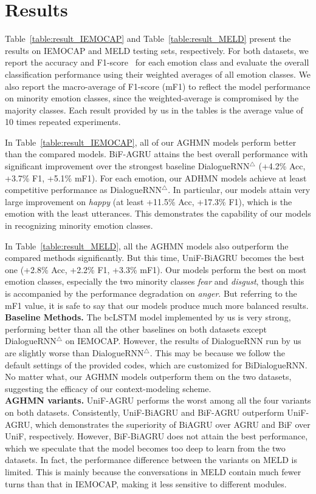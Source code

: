 \documentclass[letterpaper]{article} %
\begin{document}
\section{Results}

Table~\ref{table:result_IEMOCAP} and Table~\ref{table:result_MELD} present the results on IEMOCAP and MELD testing sets, respectively. For both datasets, we report the accuracy and F1-score~\cite{DBLP:conf/acl/TongZJM17} for each emotion class and evaluate the overall classification performance using their weighted averages of all emotion classes. We also report the macro-average of F1-score (mF1) to reflect the model performance on minority emotion classes, since the weighted-average is compromised by the majority classes. Each result provided by us in the tables is the average value of 10 times repeated experiments.

In Table~\ref{table:result_IEMOCAP}, all of our AGHMN models perform better than the compared models. BiF-AGRU attains the best overall performance with significant improvement over the strongest baseline DialogueRNN$^\triangle$ (+4.2\% Acc, +3.7\% F1, +5.1\% mF1). For each emotion, our ADHMN models achieve at least competitive performance as DialogueRNN$^\triangle$. In particular, our models attain very large improvement on \textit{happy} (at least +11.5\% Acc, +17.3\% F1), which is the emotion with the least utterances. This demonstrates the capability of our models in recognizing minority emotion classes.

In Table~\ref{table:result_MELD}, all the AGHMN models also outperform the compared methods significantly. But this time, UniF-BiAGRU becomes the best one (+2.8\% Acc, +2.2\% F1, +3.3\% mF1).
Our models perform the best on most emotion classes, especially the two minority classes \textit{fear} and \textit{disgust}, though this is accompanied by the performance degradation on \textit{anger}. But referring to the mF1 value, it is safe to say that our models produce much more balanced results. 
\\[1ex]
\noindent\textbf{Baseline Methods.}
The bcLSTM model implemented by us is very strong, performing better than all the other baselines on both datasets except DialogueRNN$^\triangle$ on IEMOCAP. However, the results of DialogueRNN run by us are slightly worse than DialogueRNN$^\triangle$. This may be because we follow the default settings of the provided codes, which are customized for BiDialogueRNN. No matter what, our AGHMN models outperform them on the two datasets, suggesting the efficacy of our context-modeling scheme.
\\[1ex]
\noindent\textbf{AGHMN variants.} 
UniF-AGRU performs the worst among all the four variants on both datasets. Consistently, UniF-BiAGRU and BiF-AGRU outperform UniF-AGRU, which demonstrates the superiority of BiAGRU over AGRU and BiF over UniF, respectively.
However, BiF-BiAGRU does not attain the best performance, which we speculate that the model becomes too deep to learn from the two datasets. In fact, the performance difference between the variants on MELD is limited. This is mainly because the conversations in MELD contain much fewer turns than that in IEMOCAP, making it less sensitive to different modules.
\end{document}
